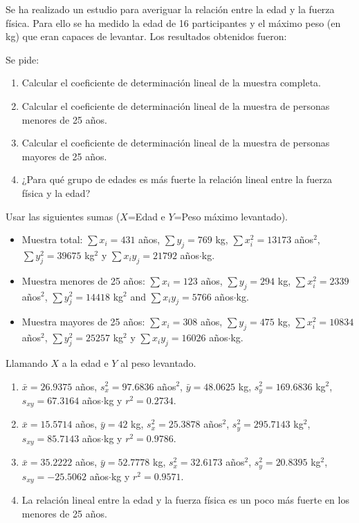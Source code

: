 {Se ha realizado un estudio para averiguar la relación entre la edad y la fuerza física. Para ello se ha medido la edad
de 16 participantes y el máximo peso (en kg) que eran capaces de levantar. Los resultados obtenidos fueron: 
\begin{center}
\resizebox{0.7\textwidth}{!}{}
\end{center}
Se pide: 
\begin{enumerate}
\item Calcular el coeficiente de determinación lineal de la muestra completa.
\item Calcular el coeficiente de determinación lineal de la muestra de personas menores de 25 años.
\item Calcular el coeficiente de determinación lineal de la muestra de personas mayores de 25 años.
\item ¿Para qué grupo de edades es más fuerte la relación lineal entre la fuerza física y la edad?
\end{enumerate}

Usar las siguientes sumas ($X$=Edad e $Y$=Peso máximo levantado).
\begin{itemize}[label=--]
\item Muestra total: $\sum x_i=431$ años, $\sum y_j=769$ kg, $\sum x_i^2=13173$ años$^2$, $\sum y_j^2=39675$
kg$^2$ y $\sum x_iy_j=21792$ años$\cdot$kg.
\item Muestra menores de 25 años: $\sum x_i=123$ años, $\sum y_j=294$ kg, $\sum x_i^2=2339$ años$^2$, $\sum y_j^2=14418$
kg$^2$ and $\sum x_iy_j=5766$ años$\cdot$kg.
\item Muestra mayores de 25 años: $\sum x_i=308$ años, $\sum y_j=475$ kg, $\sum x_i^2=10834$ años$^2$, $\sum y_j^2=25257$
kg$^2$ y $\sum x_iy_j=16026$ años$\cdot$kg.
\end{itemize}
}
{Llamando $X$ a la edad e $Y$ al peso levantado.
\begin{enumerate}
\item  $\bar x=26.9375$ años, $s_x^2=97.6836$ años$^2$, $\bar{y}=48.0625$ kg, $s_y^2=169.6836$ kg$^2$, $s_{xy}=67.3164$ años$\cdot$kg y $r^2=0.2734$. 
\item $\bar x=15.5714$ años, $\bar y=42$ kg, $s_x^2=25.3878$ años$^2$, $s_y^2=295.7143$ kg$^2$, $s_{xy}=85.7143$ años$\cdot$kg y $r^2=0.9786$.
\item $\bar x=35.2222$ años, $\bar y=52.7778$ kg, $s_x^2=32.6173$ años$^2$, $s_y^2=20.8395$ kg$^2$,
$s_{xy}=-25.5062$ años$\cdot$kg y $r^2=0.9571$.
\item La relación lineal entre la edad y la fuerza física es un poco más fuerte en los menores de 25 años.
\end{enumerate}
}
{}


